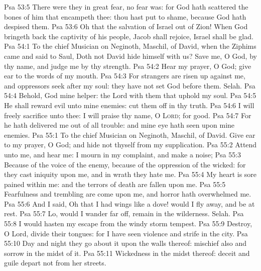 \vs Psa 53:5 There were they in great fear,  no fear was: for God hath scattered the bones of him that encampeth  thee: thou hast put  to shame, because God hath despised them.
\vs Psa 53:6 Oh that the salvation of Israel  out of Zion! When God bringeth back the captivity of his people, Jacob shall rejoice,  Israel shall be glad.
\vs Psa 54:1 To the chief Musician on Neginoth, Maschil,  of David, when the Ziphims came and said to Saul, Doth not David hide himself with us? Save me, O God, by thy name, and judge me by thy strength.
\vs Psa 54:2 Hear my prayer, O God; give ear to the words of my mouth.
\vs Psa 54:3 For strangers are risen up against me, and oppressors seek after my soul: they have not set God before them. Selah.
\vs Psa 54:4 Behold, God  mine helper: the Lord  with them that uphold my soul.
\vs Psa 54:5 He shall reward evil unto mine enemies: cut them off in thy truth.
\vs Psa 54:6 I will freely sacrifice unto thee: I will praise thy name, O \textsc{Lord}; for  good.
\vs Psa 54:7 For he hath delivered me out of all trouble: and mine eye hath seen  upon mine enemies.
\vs Psa 55:1 To the chief Musician on Neginoth, Maschil,  of David. Give ear to my prayer, O God; and hide not thyself from my supplication.
\vs Psa 55:2 Attend unto me, and hear me: I mourn in my complaint, and make a noise;
\vs Psa 55:3 Because of the voice of the enemy, because of the oppression of the wicked: for they cast iniquity upon me, and in wrath they hate me.
\vs Psa 55:4 My heart is sore pained within me: and the terrors of death are fallen upon me.
\vs Psa 55:5 Fearfulness and trembling are come upon me, and horror hath overwhelmed me.
\vs Psa 55:6 And I said, Oh that I had wings like a dove!  would I fly away, and be at rest.
\vs Psa 55:7 Lo,  would I wander far off,  remain in the wilderness. Selah.
\vs Psa 55:8 I would hasten my escape from the windy storm  tempest.
\vs Psa 55:9 Destroy, O Lord,  divide their tongues: for I have seen violence and strife in the city.
\vs Psa 55:10 Day and night they go about it upon the walls thereof: mischief also and sorrow  in the midst of it.
\vs Psa 55:11 Wickedness  in the midst thereof: deceit and guile depart not from her streets.

